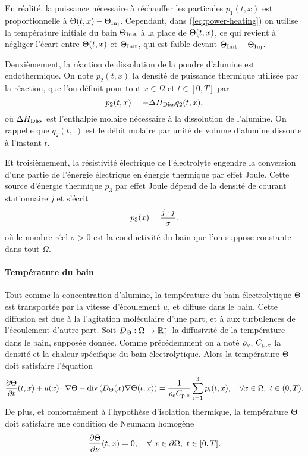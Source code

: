 \begin{remarque}
  En réalité, la puissance nécessaire à réchauffer les particules
  $p_1(t, x)$ est proportionnelle à ${\Theta(t, x) -
    \Theta_\text{Inj}}$. Cependant, dans (\ref{eq:power-heating}) on utilise la
  température initiale du bain $\Theta_\text{Init}$ à la place de
  $\Theta(t, x)$, ce qui revient à négliger l'écart entre
  $\Theta(t, x)$ et $\Theta_\text{Init}$, qui est faible devant ${\Theta_\text{Init} -
  \Theta_\text{Inj}}$.
\end{remarque}

Deuxièmement, la réaction de dissolution de la poudre d'alumine est
endothermique. On note $p_2(t, x)$ la densité de puissance thermique
utilisée par la réaction, que l'on définit pour tout $x\in\Omega$ et
$t\in[0, T]$ par
\begin{equation}\label{eq:p2}
p_2(t, x) = - \Delta H_\text{Diss} q_2(t, x),
\end{equation}
où $\Delta H_\text{Diss}$ est l'enthalpie molaire nécessaire à
la dissolution de l'alumine. On rappelle que $q_2(t, .)$ est le
débit molaire par unité de volume d'alumine dissoute à l'instant $t$.

Et troisièmement, la résistivité électrique de l'électrolyte engendre
la conversion d'une partie de l'énergie électrique en énergie
thermique par effet Joule. Cette source d'énergie thermique $p_3$ par
effet Joule dépend de la densité de courant stationnaire $j$ et
s'écrit
\begin{equation}\label{eq:p3}
p_3(x) = \frac{j\cdot j}{\sigma}.
\end{equation}
où le nombre réel $\sigma > 0$ est la conductivité du bain que l'on
suppose constante dans tout $\Omega$.

\paragraph{Température du bain}
Tout comme la concentration d'alumine, la température du bain
électrolytique $\Theta$ est transportée par la vitesse
d'écoulement $u$, et diffuse dans le bain. Cette diffusion est due à
la l'agitation moléculaire d'une part, et à aux turbulences de
l'écoulement d'autre part. Soit $D_\Theta:\Omega\to\mathbb
R^*_+$ la diffusivité de la température dans le bain, supposée
donnée. Comme précédemment on a noté $\rho_\mathrm{e}$,
$C_{\mathrm{p,e}}$ la densité et la chaleur spécifique du bain
électrolytique. Alors la température $\Theta$ doit satisfaire
l'équation
\begin{equation}\label{eq:temperature}
\frac{\partial \Theta}{\partial t}(t, x) +
u(x)\cdot\nabla\Theta - \mathrm{div}\left( D_\Theta(x)\nabla
\Theta(t, x) \right) =
\frac{1}{\rho_\mathrm{e}C_{\mathrm{p,e}}}\sum_{i = 1}^{3}p_i(t, x),
\quad \forall x\in\Omega,\ t\in(0, T).
\end{equation}
De plus, et conformément à l'hypothèse d'isolation thermique, la température
$\Theta$ doit satisfaire une condition de Neumann homogène
\begin{equation}\label{eq:t-bc}
  \frac{\partial \Theta}{\partial \nu}(t, x) = 0, \quad
  \forall\ x\in\partial \Omega,\ t\in[0, T].
\end{equation}

